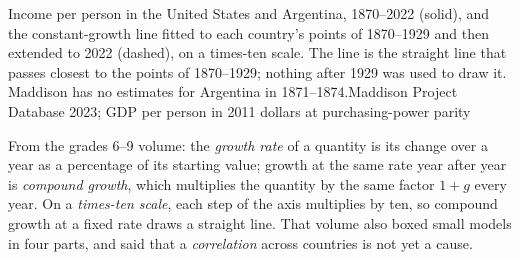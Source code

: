 \begin{openingchart}{Income per person in the United States and Argentina, 1870--2022 (solid),
and the constant-growth line fitted to each country's points of 1870--1929 and then extended to
2022 (dashed), on a times-ten scale. The line is the straight line that passes closest to the
points of 1870--1929; nothing after 1929 was used to draw it. Maddison has no estimates for
Argentina in 1871--1874.}{Maddison Project Database 2023; GDP per person in 2011 dollars at purchasing-power parity}
\end{openingchart}

\begin{recall}
From the grades 6--9 volume: the \emph{growth rate} of a quantity is its change over a year as a
percentage of its starting value; growth at the same rate year after year is \emph{compound
growth}, which multiplies the quantity by the same factor $1+g$ every year. On a
\emph{times-ten scale}, each step of the axis multiplies by ten, so compound growth at a fixed rate
draws a straight line. That volume also boxed small models in four parts, and said that a
\emph{correlation} across countries is not yet a cause.
\end{recall}

